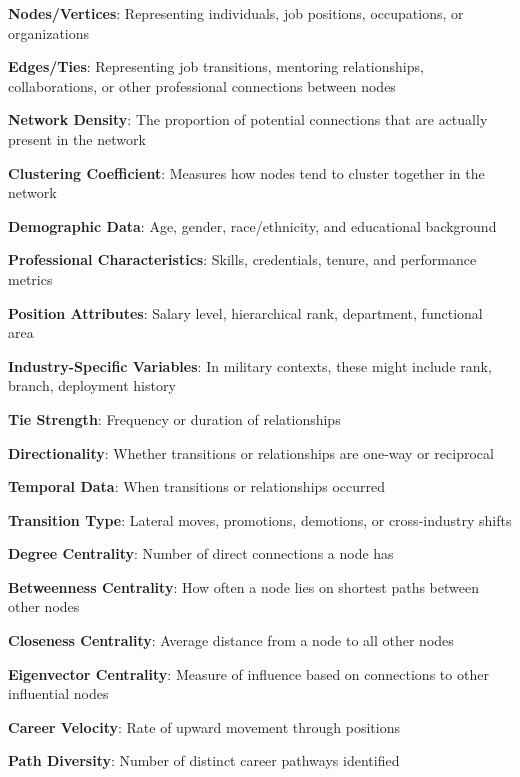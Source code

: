 \documentclass[../main.tex]{subfiles}
\begin{document}
\textbf{Nodes/Vertices}: Representing individuals, job positions, occupations, or organizations \citep{wikipedia_sna}

\textbf{Edges/Ties}: Representing job transitions, mentoring relationships, collaborations, or other professional connections between nodes \citep{wikipedia_sna}

\textbf{Network Density}: The proportion of potential connections that are actually present in the network

\textbf{Clustering Coefficient}: Measures how nodes tend to cluster together in the network

\textbf{Demographic Data}: Age, gender, race/ethnicity, and educational background

\textbf{Professional Characteristics}: Skills, credentials, tenure, and performance metrics

\textbf{Position Attributes}: Salary level, hierarchical rank, department, functional area

\textbf{Industry-Specific Variables}: In military contexts, these might include rank, branch, deployment history

\textbf{Tie Strength}: Frequency or duration of relationships

\textbf{Directionality}: Whether transitions or relationships are one-way or reciprocal

\textbf{Temporal Data}: When transitions or relationships occurred

\textbf{Transition Type}: Lateral moves, promotions, demotions, or cross-industry shifts \citep{indeed_career_trajectory}

\textbf{Degree Centrality}: Number of direct connections a node has

\textbf{Betweenness Centrality}: How often a node lies on shortest paths between other nodes

\textbf{Closeness Centrality}: Average distance from a node to all other nodes

\textbf{Eigenvector Centrality}: Measure of influence based on connections to other influential nodes \citep{cambridge_intelligence_centrality}

\textbf{Career Velocity}: Rate of upward movement through positions

\textbf{Path Diversity}: Number of distinct career pathways identified
\end{document}
